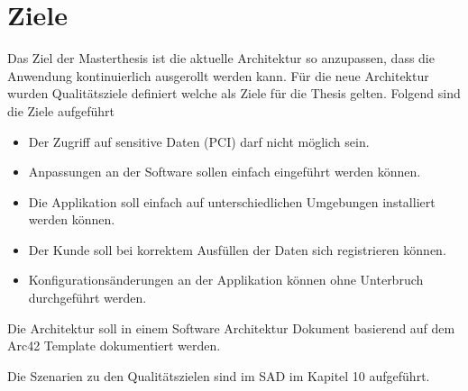 \chapter{Ziele}

Das Ziel der Masterthesis ist die aktuelle Architektur so anzupassen, dass die Anwendung kontinuierlich ausgerollt werden kann. Für die neue Architektur wurden Qualitätsziele definiert welche als Ziele für die Thesis gelten. Folgend sind die Ziele aufgeführt

\begin{itemize}
	\item Der Zugriff auf sensitive Daten (PCI) darf nicht möglich sein.
	\item Anpassungen an der Software sollen einfach eingeführt werden können.
	\item Die Applikation soll einfach auf unterschiedlichen Umgebungen installiert werden können.
	\item Der Kunde soll bei korrektem Ausfüllen der Daten sich registrieren können.
	\item Konfigurationsänderungen an der Applikation können ohne Unterbruch durchgeführt werden.
\end{itemize}

Die Architektur soll in einem Software Architektur Dokument basierend auf dem Arc42 Template dokumentiert werden.

Die Szenarien zu den Qualitätszielen sind im SAD im Kapitel 10 aufgeführt.
